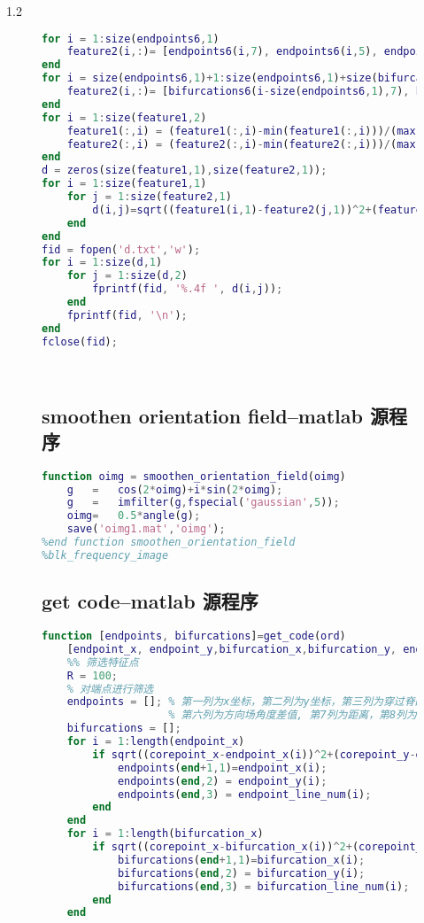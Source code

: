 \documentclass{whutmod}
\begin{document}
\begin{spacing}{1.2}
\begin{figure}[H]
\begin{lstlisting}[language=matlab]
for i = 1:size(endpoints6,1)
    feature2(i,:)= [endpoints6(i,7), endpoints6(i,5), endpoints6(i,6), 1, endpoints6(i,3)];
end
for i = size(endpoints6,1)+1:size(endpoints6,1)+size(bifurcations6,1)
    feature2(i,:)= [bifurcations6(i-size(endpoints6,1),7), bifurcations6(i-size(endpoints6,1),5), bifurcations6(i-size(endpoints6,1),6), 2, bifurcations6(i-size(endpoints6,1),3)];
end
for i = 1:size(feature1,2)
    feature1(:,i) = (feature1(:,i)-min(feature1(:,i)))/(max(feature1(:,i))-min(feature1(:,i)));
    feature2(:,i) = (feature2(:,i)-min(feature2(:,i)))/(max(feature2(:,i))-min(feature2(:,i)));
end
d = zeros(size(feature1,1),size(feature2,1));
for i = 1:size(feature1,1)
    for j = 1:size(feature2,1)
        d(i,j)=sqrt((feature1(i,1)-feature2(j,1))^2+(feature1(i,2)-feature2(j,2))^2+(feature1(i,3)-feature2(j,3))^2+(feature1(i,4)-feature2(j,4))^2+(feature1(i,5)-feature2(j,5))^2);
    end
end
fid = fopen('d.txt','w');
for i = 1:size(d,1)
    for j = 1:size(d,2)
        fprintf(fid, '%.4f ', d(i,j));
    end
    fprintf(fid, '\n');
end
fclose(fid);

	
\end{lstlisting}

\subsection{smoothen orientation field--matlab 源程序}
\begin{lstlisting}[language=matlab]
	function oimg = smoothen_orientation_field(oimg)
    g   =   cos(2*oimg)+i*sin(2*oimg);
    g   =   imfilter(g,fspecial('gaussian',5));
    oimg=   0.5*angle(g);
    save('oimg1.mat','oimg');
%end function smoothen_orientation_field
%blk_frequency_image
\end{lstlisting}


\subsection{get code--matlab 源程序}
\begin{lstlisting}[language=matlab]
	function [endpoints, bifurcations]=get_code(ord)
	[endpoint_x, endpoint_y,bifurcation_x,bifurcation_y, endpoint_line_num, bifurcation_line_num, corepoint_y, corepoint_x,oimg] = solve_pro(ord);
	%% 筛选特征点
	R = 100;
	% 对端点进行筛选
	endpoints = []; % 第一列为x坐标，第二列为y坐标，第三列为穿过脊的数量，第四列为方向场，第五列为极坐标系下的角度
					% 第六列为方向场角度差值, 第7列为距离，第8列为ρ
	bifurcations = [];
	for i = 1:length(endpoint_x)
		if sqrt((corepoint_x-endpoint_x(i))^2+(corepoint_y-endpoint_y(i))^2) <= R
			endpoints(end+1,1)=endpoint_x(i);
			endpoints(end,2) = endpoint_y(i);
			endpoints(end,3) = endpoint_line_num(i);
		end
	end
	for i = 1:length(bifurcation_x)
		if sqrt((corepoint_x-bifurcation_x(i))^2+(corepoint_y-bifurcation_y(i))^2) <= R
			bifurcations(end+1,1)=bifurcation_x(i);
			bifurcations(end,2) = bifurcation_y(i);
			bifurcations(end,3) = bifurcation_line_num(i);
		end
	end
	

\end{lstlisting}
\end{figure}
\end{spacing}
\end{document}
